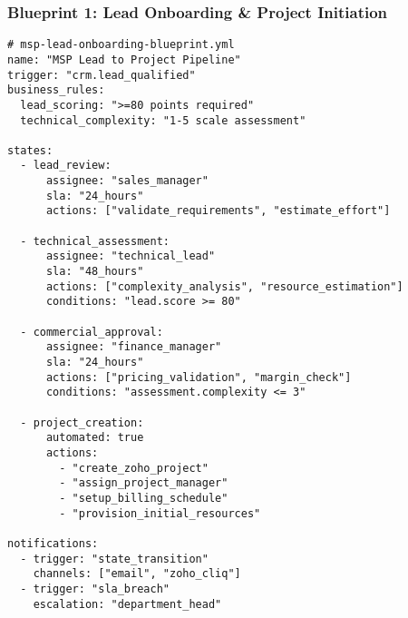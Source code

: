 \subsubsection{Blueprint 1: Lead Onboarding \& Project Initiation}
\begin{verbatim}
# msp-lead-onboarding-blueprint.yml
name: "MSP Lead to Project Pipeline"
trigger: "crm.lead_qualified"
business_rules:
  lead_scoring: ">=80 points required"
  technical_complexity: "1-5 scale assessment"
  
states:
  - lead_review:
      assignee: "sales_manager"
      sla: "24_hours"
      actions: ["validate_requirements", "estimate_effort"]
      
  - technical_assessment:
      assignee: "technical_lead" 
      sla: "48_hours"
      actions: ["complexity_analysis", "resource_estimation"]
      conditions: "lead.score >= 80"
      
  - commercial_approval:
      assignee: "finance_manager"
      sla: "24_hours" 
      actions: ["pricing_validation", "margin_check"]
      conditions: "assessment.complexity <= 3"
      
  - project_creation:
      automated: true
      actions: 
        - "create_zoho_project"
        - "assign_project_manager" 
        - "setup_billing_schedule"
        - "provision_initial_resources"

notifications:
  - trigger: "state_transition"
    channels: ["email", "zoho_cliq"]
  - trigger: "sla_breach"
    escalation: "department_head"
\end{verbatim}

